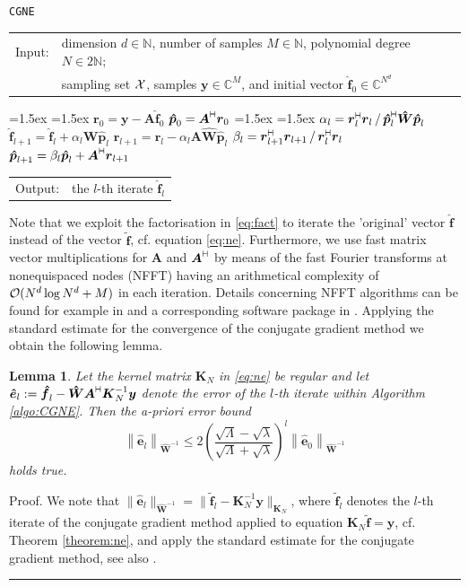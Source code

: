\documentclass[11pt,a4paper,bibtotoc]{scrartcl}
\def\N{\mathbb{N}}
\def\C{\mathbb{C}}
\newcommand{\zb}[1]{\ensuremath{\boldsymbol{#1}}}
\newcommand{\adj}{{\vdash \hspace*{-1.72mm} \dashv}}
\renewcommand{\Box}{\hspace*{0ex} \hfill \rule{1.5ex}{1.5ex} \\ \goodbreak}
\newtheorem{lemma}[theorem]{Lemma}
\newenvironment{Lemma}{\goodbreak \begin{lemma}\sl}{\end{lemma}}
\numberwithin{equation}{section}
\numberwithin{table}{section}
\numberwithin{figure}{section}
\begin{document}
\begin{algorithm}[h!]
  \caption{\tt CGNE}\label{algo:CGNE}
  \begin{tabular}{ll}
    Input: & dimension $d\in \N$, number of samples $M\in \N$, polynomial
    degree $N\in 2\N$;\\
    & sampling set $\cal X$, samples $\zb y \in \C^M$, and initial vector $\zb
    {\hat f}_0 \in \C^{N^d}$
  \end{tabular}
  \begin{algorithmic}[1]
    \topsep=1.5ex \itemsep=1.5ex
    \STATE $\zb {r}_0=\zb y - \zb A \zb {\hat f}_0$
    \STATE $\zb {\hat p}_0=\zb A^{\adj} \zb {r}_0$
    \topsep=1.5ex \itemsep=1.5ex
    \STATE $\alpha_l= \zb {r}_l^{\adj} \zb {r}_l \,/\,
    {\zb {\hat p}_l^{\adj} \zb {\hat W} \zb {\hat p}_l}$
    \STATE $\zb {\hat f}_{l+1}=\zb {\hat f}_{l}
    +\alpha_l \zb {\hat W} \zb {\hat p}_l$
    \STATE $\zb {r}_{l+1}=\zb {r}_{l}- \alpha_l \zb A \zb {\hat W} \zb {\hat
    p}_l$ 
    \STATE $\beta_l={\zb {r}_{l+1}^{\adj} \zb {r}_{l+1}}\,/\,
    {\zb {r}_l^{\adj} \zb {r}_l}$
    \STATE $\zb {\hat p}_{l+1}=\beta_l \zb {\hat p}_l + \zb A^{\adj} \zb
    {r}_{l+1}$ 
    \ENDFOR
  \end{algorithmic}
  \begin{tabular}{ll}
    Output: & the $l$-th iterate $\zb {\hat f}_{l}$
  \end{tabular}
\end{algorithm}

Note that we exploit the factorisation in \eqref{eq:fact} to iterate the
'original' vector $\zb {\hat f}$ instead of the vector $\zb {\tilde f}$,
cf. equation \eqref{eq:ne}.
Furthermore, we use fast matrix vector multiplications for $\zb A$ and $\zb
A^{\adj}$ by means of the fast Fourier transforms at nonequispaced nodes
(NFFT) having an arithmetical complexity of ${\cal O}(N^d\log N^d+M)$ in each
  iteration.
Details concerning NFFT algorithms can be found for example in \cite{st97,
  postta01} and a corresponding software package in \cite{kupo02C}.
Applying the standard estimate for the convergence of the conjugate gradient
method we obtain the following lemma.

\begin{Lemma}\label{lemma:cg_error}
Let the kernel matrix $\zb K_N$ in \eqref{eq:ne} be regular and let
 $\zb {\hat e}_l:=\zb {\hat f}_l-\zb {\hat W}\zb A^{\adj}\zb K_N^{-1} \zb y$
 denote the error of the $l$-th iterate within Algorithm \ref{algo:CGNE}.
Then the a-priori error bound
\begin{equation*}
  \left\|\zb {\hat e}_l\right\|_{\zb {\hat W}^{-1}} \le
  2 \left(\frac{\sqrt{\Lambda}-\sqrt{\lambda}}{\sqrt{\Lambda}+
  \sqrt{\lambda}}\right)^l 
  \left\|\zb {\hat e}_0\right\|_{\zb {\hat W}^{-1}}
\end{equation*}
holds true.
\end{Lemma}
Proof. We note that $\|\zb {\hat e}_l\|_{\zb {\hat W}^{-1}}=\|\zb {\tilde f}_l
- \zb K_N^{-1} \zb y\|_{\zb K_N}$, where $\zb {\tilde f}_l$ denotes the $l$-th
iterate of the conjugate gradient method applied to equation $\zb K_N \zb
{\tilde f} = \zb y$, cf. Theorem \ref{theorem:ne}, and apply the standard
estimate for the conjugate gradient method, see also \cite[pp. 288]{Bj96}. \Box
\end{document}
